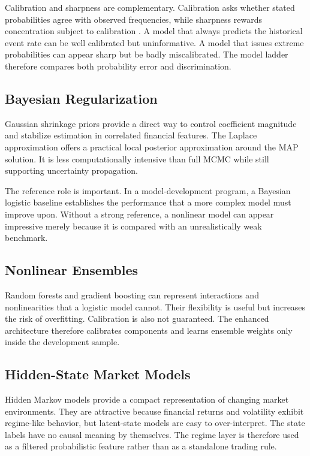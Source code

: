 \documentclass[11pt]{article}
\begin{document}
Calibration and sharpness are complementary. Calibration asks whether stated probabilities agree with observed frequencies, while sharpness rewards concentration subject to calibration \citep{gneiting2007calibration}. A model that always predicts the historical event rate can be well calibrated but uninformative. A model that issues extreme probabilities can appear sharp but be badly miscalibrated. The model ladder therefore compares both probability error and discrimination.

\subsection{Bayesian Regularization}
Gaussian shrinkage priors provide a direct way to control coefficient magnitude and stabilize estimation in correlated financial features. The Laplace approximation offers a practical local posterior approximation around the MAP solution. It is less computationally intensive than full MCMC while still supporting uncertainty propagation.

The reference role is important. In a model-development program, a Bayesian logistic baseline establishes the performance that a more complex model must improve upon. Without a strong reference, a nonlinear model can appear impressive merely because it is compared with an unrealistically weak benchmark.

\subsection{Nonlinear Ensembles}
Random forests \citep{breiman2001random} and gradient boosting \citep{friedman2001greedy} can represent interactions and nonlinearities that a logistic model cannot. Their flexibility is useful but increases the risk of overfitting. Calibration is also not guaranteed. The enhanced architecture therefore calibrates components and learns ensemble weights only inside the development sample.

\subsection{Hidden-State Market Models}
Hidden Markov models provide a compact representation of changing market environments. They are attractive because financial returns and volatility exhibit regime-like behavior, but latent-state models are easy to over-interpret. The state labels have no causal meaning by themselves. The regime layer is therefore used as a filtered probabilistic feature rather than as a standalone trading rule.
\end{document}
